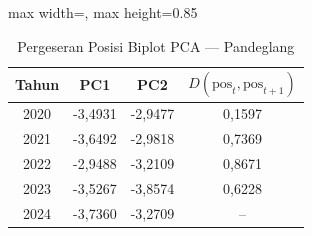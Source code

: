 \begin{table}[H]
\centering
\caption{Pergeseran Posisi Biplot PCA --- Pandeglang} \label{tab:appjarak_pca_skor_pandeglang}
\begin{adjustbox}{max width=\textwidth, max height=0.85\textheight}
\begin{tabular}{|c|c|c|c|}
\hline
\textbf{Tahun} & \textbf{PC1} & \textbf{PC2} & \textbf{$D(\text{pos}_t, \text{pos}_{t+1})$} \\
\hline
2020 & -3,4931 & -2,9477 & 0,1597 \\
2021 & -3,6492 & -2,9818 & 0,7369 \\
2022 & -2,9488 & -3,2109 & 0,8671 \\
2023 & -3,5267 & -3,8574 & 0,6228 \\
2024 & -3,7360 & -3,2709 & -- \\
\hline
\end{tabular}
\end{adjustbox}
\end{table}